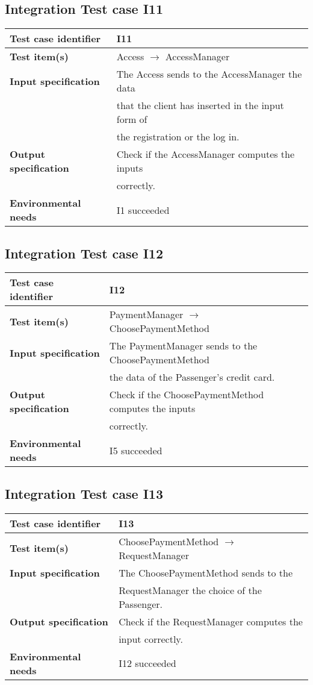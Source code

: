 \documentclass[18pt,oneside,a4paper, titlepage]{article}
\begin{document}
	\subsection{Integration Test case I11}
		\begin{tabular}{ l l}
			\hline 		\textbf{Test case identifier} & I11 \\
			\hline		\textbf{Test item(s)}  & Access $\rightarrow$ AccessManager \\
			\hline		\textbf{Input specification} & The Access sends to the AccessManager the data\\ & that the client has inserted in the input form of \\ & the registration or the log in.\\
			\hline		\textbf{Output specification} & Check if the AccessManager computes the inputs\\ & correctly.\\
			\hline		\textbf{Environmental needs} & I1 succeeded\\
			\hline
		\end{tabular}
	\subsection{Integration Test case I12}
		\begin{tabular}{ l l}
			\hline 		\textbf{Test case identifier} & I12 \\
			\hline		\textbf{Test item(s)}  & PaymentManager $\rightarrow$ ChoosePaymentMethod \\
			\hline		\textbf{Input specification} & The PaymentManager sends to the ChoosePaymentMethod \\ & the data of the Passenger's credit card.\\
			\hline		\textbf{Output specification} & Check if the ChoosePaymentMethod computes the inputs \\ & correctly.\\
			\hline		\textbf{Environmental needs} & I5 succeeded\\
			\hline
		\end{tabular}
	\subsection{Integration Test case I13}
		\begin{tabular}{ l l}
			\hline 		\textbf{Test case identifier} & I13 \\
			\hline		\textbf{Test item(s)}  & ChoosePaymentMethod $\rightarrow$ RequestManager \\
			\hline		\textbf{Input specification} & The ChoosePaymentMethod sends to the \\ & RequestManager the choice of the Passenger.\\
			\hline		\textbf{Output specification} & Check if the RequestManager computes the\\ & input correctly.\\
			\hline		\textbf{Environmental needs} & I12 succeeded\\
			\hline
		\end{tabular}
\end{document}

